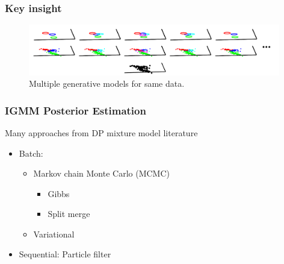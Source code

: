 \documentclass{beamer}
\begin{document}
\begin{frame}
\frametitle{Key insight}
\begin{center}
\begin{figure}
\includegraphics[width=11cm]{figures/posterior_schematic.pdf}
\caption{Multiple generative models for same data.}
\end{figure}
\end{center} 
\end{frame}



\begin{frame}[t]
\frametitle{IGMM Posterior Estimation}
\begin{block}{Many approaches from DP mixture model literature}
\begin{itemize}
\item Batch: 
\begin{itemize}
\item Markov chain Monte Carlo (MCMC)
\begin{itemize}
\item Gibbs \citep{Neal2000,Maceachern1998}
\item Split merge \citep{Jain2004}
\end{itemize}
\item Variational \citep{Blei2005}
\end{itemize}
\item Sequential: Particle filter \citep{Maceachern1999,Fearnhead2004}
\end{itemize}
\end{block}
\end{frame}
\end{document}
